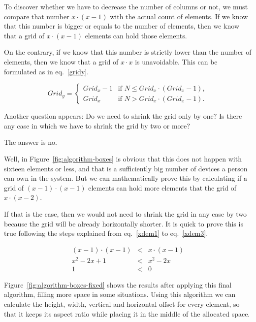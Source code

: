 To discover whether we have to decrease the number of columns or not, we must compare that number $x \cdot( x - 1)$ with the actual count of elements.
If we know that this number is bigger or equals to the number of elements, then we know that a grid of $x \cdot (x - 1)$ elements can hold those elements.

On the contrary, if we know that this number is strictly lower than the number of elements, then we know that a grid of $x \cdot x$ is unavoidable.
This can be formulated as in eq.~\eqref{gridy}.

\begin{equation}
  Grid_{y} = 
  \begin{cases}
    Grid_{x} - 1 & \text{if } N \leq Grid_{x} \cdot (Grid_{x} - 1),\\
    Grid_{x} & \text{if } N > Grid_{x} \cdot (Grid_{x} - 1).
  \end{cases} \label{gridy}
\end{equation}

Another question appears: Do we need to shrink the grid only by one?
Is there any case in which we have to shrink the grid by two or more?

The answer is no.

Well, in Figure~\vref{fig:algorithm-boxes} is obvious that this does not happen with sixteen elements or less, and that is a sufficiently big number of devices a person can own in the system.
But we can mathematically prove this by calculating if a grid of $(x - 1) \cdot (x - 1)$ elements can hold more elements that the grid of $x \cdot (x - 2)$.

If that is the case, then we would not need to shrink the grid in any case by two because the grid will be already horizontally shorter.
It is quick to prove this is true following the steps explained from eq.~\eqref{xdem1} to eq.~\eqref{xdem3}.

\begin{eqnarray}
  (x-1) \cdot (x-1) &<& x \cdot (x-1) \label{xdem1} \\
  x^2-2x+1 &<& x^2-2x \label{xdem2} \\
  1 &<& 0 \label{xdem3}
\end{eqnarray}

Figure~\vref{fig:algorithm-boxes-fixed} shows the results after applying this final algorithm, filling more space in some situations.
Using this algorithm we can calculate the height, width, vertical and horizontal offset for every element, so that it keeps its aspect ratio while placing it in the middle of the allocated space.

